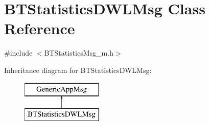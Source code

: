 \hypertarget{classBTStatisticsDWLMsg}{}\section{B\+T\+Statistics\+D\+W\+L\+Msg Class Reference}
\label{classBTStatisticsDWLMsg}


{\ttfamily \#include $<$B\+T\+Statistics\+Msg\+\_\+m.\+h$>$}

Inheritance diagram for B\+T\+Statistics\+D\+W\+L\+Msg\+:\begin{figure}[H]
\begin{center}
\leavevmode
\includegraphics[height=2.000000cm]{classBTStatisticsDWLMsg}
\end{center}
\end{figure}
